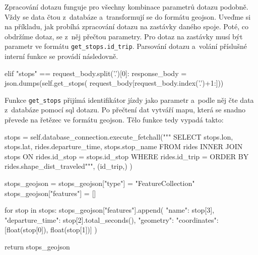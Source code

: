 \bigbreak


Zpracování dotazu funguje pro všechny kombinace parametrů dotazu podobně. Vždy se data čtou z~databáze a~transformují se do formátu \gls{geojson}. Uveďme si na příkladu, jak probíhá zpracování dotazu na zastávky daného spoje. Poté, co obdržíme dotaz, se z~něj přečtou parametry. Pro dotaz na zastávky musí být parametr ve formátu \verb-get_stops.id_trip-. Parsování dotazu a~volání příslušné interní funkce se provádí následovně.


\begin{code}[frame=none]
elif "stops" == request_body.split('.')[0]:
  response_body = json.dumps(self.get_stops(
    request_body[request_body.index('.')+1:]))
\end{code}


Funkce \verb-get_stops- přijímá identifikátor jízdy jako parametr a~podle něj čte data z~databáze pomocí \gls{sql} dotazu. Po přečtení dat vytváří mapu, která se snadno převede na řetězec ve formátu \gls{geojson}. Tělo funkce tedy vypadá takto:


\begin{code}[frame=none]
stops = self.database_connection.execute_fetchall("""
SELECT
  stops.lon,
  stops.lat,
  rides.departure_time,
  stops.stop_name
FROM rides
INNER JOIN stops ON rides.id_stop = stops.id_stop
WHERE rides.id_trip = %
ORDER BY rides.shape_dist_traveled""",
(id_trip,)
)


stops_geojson = {}
stops_geojson["type"] = "FeatureCollection"
stops_geojson["features"] = []


for stop in stops:
stops_geojson["features"].append({
  "name": stop[3],
  "departure_time": stop[2].total_seconds(),
  "geometry": {
    "coordinates": [float(stop[0]), float(stop[1])]
  }
})


return stops_geojson
\end{code}






































